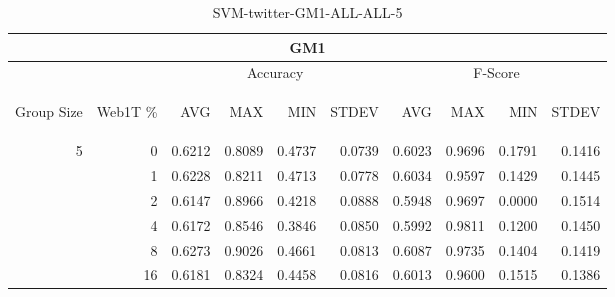 \begin{center}
\begin{table}[htbp] 
 \begin{center}
\begin{tabular}{ | r | r | r | r | r | r | r | r | r | r |}
\hline
\multicolumn{10}{|c|}{GM1}\\
\hline
 & & \multicolumn{4}{|c|}{Accuracy} & \multicolumn{4}{|c|}{F-Score}\\ \cline{3-10}
\begin{sideways}Group Size\end{sideways} & \begin{sideways}Web1T \%\end{sideways} & \begin{sideways}AVG\end{sideways} & \begin{sideways}MAX\end{sideways} & \begin{sideways}MIN\end{sideways} & \begin{sideways}STDEV\end{sideways} & \begin{sideways}AVG\end{sideways} & \begin{sideways}MAX\end{sideways} & \begin{sideways}MIN\end{sideways} & \begin{sideways}STDEV\end{sideways}\\
\hline
\multirow{5}{*}{5}
 & 0 & 0.6212 & 0.8089 & 0.4737 & 0.0739 & 0.6023 & 0.9696 & 0.1791 & 0.1416\\ \cline{2-10}
 & 1 & 0.6228 & 0.8211 & 0.4713 & 0.0778 & 0.6034 & 0.9597 & 0.1429 & 0.1445\\ \cline{2-10}
 & 2 & 0.6147 & 0.8966 & 0.4218 & 0.0888 & 0.5948 & 0.9697 & 0.0000 & 0.1514\\ \cline{2-10}
 & 4 & 0.6172 & 0.8546 & 0.3846 & 0.0850 & 0.5992 & 0.9811 & 0.1200 & 0.1450\\ \cline{2-10}
 & 8 & 0.6273 & 0.9026 & 0.4661 & 0.0813 & 0.6087 & 0.9735 & 0.1404 & 0.1419\\ \cline{2-10}
 & 16 & 0.6181 & 0.8324 & 0.4458 & 0.0816 & 0.6013 & 0.9600 & 0.1515 & 0.1386\\ \cline{2-10}
\hline
\end{tabular}
\caption{SVM-twitter-GM1-ALL-ALL-5}
\label{table:SVM-twitter-GM1-ALL-ALL-5}
\end{center}
 \end{table}
\end{center}

